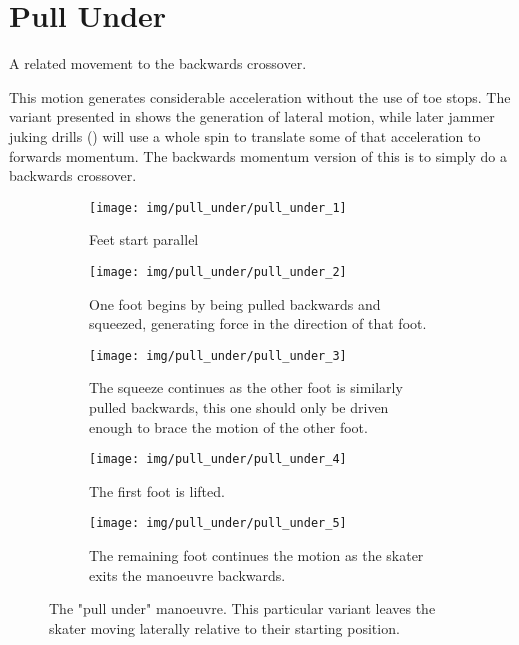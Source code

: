 \section{Pull Under}
\label{sec:crossovers/pull_under}
A related movement to the backwards crossover. 

This motion generates considerable acceleration without the use of toe stops.
The variant presented in  shows the generation of lateral motion, while later jammer juking drills () will use a whole spin to translate some of that acceleration to forwards momentum.    
The backwards momentum version of this is to simply do a backwards crossover.


\begin{figure}
\begin{subfigure}{0.3\linewidth}
\texttt{[image: img/pull\_under/pull\_under\_1]}
\caption{Feet start parallel}
\end{subfigure}
\begin{subfigure}{0.3\linewidth}
\texttt{[image: img/pull\_under/pull\_under\_2]}
\caption{One foot begins by being pulled backwards and squeezed, generating force in the direction of that foot.}
\end{subfigure}
\begin{subfigure}{0.3\linewidth}
\texttt{[image: img/pull\_under/pull\_under\_3]}
\caption{The squeeze continues as the other foot is similarly pulled backwards, this one should only be driven enough to brace the motion of the other foot.}     
\end{subfigure}
\begin{subfigure}{0.3\linewidth}
\texttt{[image: img/pull\_under/pull\_under\_4]}
\caption{The first foot is lifted.}
\end{subfigure}
\begin{subfigure}{0.3\linewidth}
\texttt{[image: img/pull\_under/pull\_under\_5]}
\caption{The remaining foot continues the motion as the skater exits the manoeuvre backwards.} 
\end{subfigure}
\caption{The "pull under" manoeuvre. This particular variant leaves the skater moving laterally relative to their starting position.  \label{fig:pull_under}}
\end{figure}
